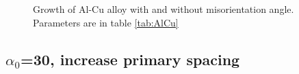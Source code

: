 \documentclass[a4paper,12pt]{article}
\begin{document}
\begin{figure}[!ht]
     \hfill
     \caption{Growth of Al-Cu alloy with and without misorientation angle. Parameters are in table \ref{tab:AlCu}}
     \label{fig:Ech}
   \end{figure}
\subsection{$\alpha_0$=30, increase primary spacing}
\end{document}
